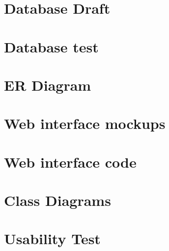     \section{Database Draft}
      \label{sec:Databasedrafts}
      
    \section{Database test}
      \label{app:dbTest}
      
    \section{ER Diagram}
    \label{errDiagram}
      
    \section{Web interface mockups}
      
            \label{app:Mock}
    \section{Web interface code}
    	
    	      \label{webIHTML}

    \section{Class Diagrams}
    \label{app:Class-diagrams}
      
    
   \section{Usability Test}
      
      \label{app:quest}



\appendix
\listoffigures
\listoftables
\lstlistoflistings


